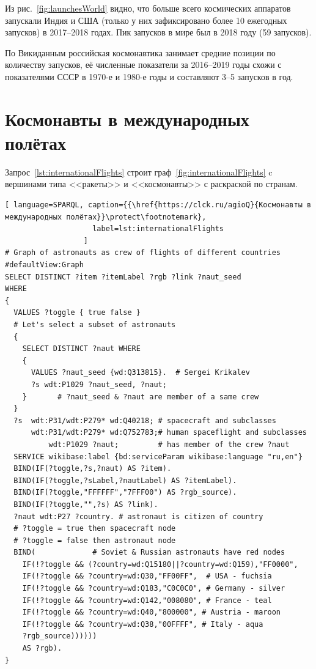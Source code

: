 Из рис.~\ref{fig:launchesWorld} видно, что больше всего космических аппаратов 
запускали Индия и США 
(только у них зафиксировано более 10 ежегодных запусков) в 2017--2018 годах. 
Пик запусков в мире был в 2018 году (59 запусков). 

По Викиданным российская космонавтика занимает средние позиции по количеству запусков, 
её численные показатели за 2016--2019 годы схожи с показателями СССР в 1970-е и 1980-е годы 
и составляют 3--5 запусков в год.

\section{Космонавты в международных полётах}

Запрос~\ref{lst:internationalFlights} строит граф~\ref{fig:internationalFlights} c вершинами типа <<ракеты>> и <<космонавты>> с раскраской по странам.

\begin{lstlisting}[ language=SPARQL, caption={{\href{https://clck.ru/agioQ}{Космонавты в международных полётах}}\protect\footnotemark}, 
                    label=lst:internationalFlights
                  ]
# Graph of astronauts as crew of flights of different countries
#defaultView:Graph
SELECT DISTINCT ?item ?itemLabel ?rgb ?link ?naut_seed
WHERE
{ 
  VALUES ?toggle { true false }
  # Let's select a subset of astronauts
  {
    SELECT DISTINCT ?naut WHERE
    { 
      VALUES ?naut_seed {wd:Q313815}.  # Sergei Krikalev
      ?s wdt:P1029 ?naut_seed, ?naut;  
    }       # ?naut_seed & ?naut are member of a same crew
  }
  ?s  wdt:P31/wdt:P279* wd:Q40218; # spacecraft and subclasses
      wdt:P31/wdt:P279* wd:Q752783;# human spaceflight and subclasses
          wdt:P1029 ?naut;         # has member of the crew ?naut    
  SERVICE wikibase:label {bd:serviceParam wikibase:language "ru,en"}
  BIND(IF(?toggle,?s,?naut) AS ?item).
  BIND(IF(?toggle,?sLabel,?nautLabel) AS ?itemLabel).
  BIND(IF(?toggle,"FFFFFF","7FFF00") AS ?rgb_source).
  BIND(IF(?toggle,"",?s) AS ?link).
  ?naut wdt:P27 ?country. # astronaut is citizen of country 
  # ?toggle = true then spacecraft node
  # ?toggle = false then astronaut node
  BIND(             # Soviet & Russian astronauts have red nodes
    IF(!?toggle && (?country=wd:Q15180||?country=wd:Q159),"FF0000",
    IF(!?toggle && ?country=wd:Q30,"FF00FF",  # USA - fuchsia
    IF(!?toggle && ?country=wd:Q183,"C0C0C0", # Germany - silver
    IF(!?toggle && ?country=wd:Q142,"008080", # France - teal
    IF(!?toggle && ?country=wd:Q40,"800000", # Austria - maroon
    IF(!?toggle && ?country=wd:Q38,"00FFFF", # Italy - aqua
    ?rgb_source))))))
    AS ?rgb).
}
\end{lstlisting}

